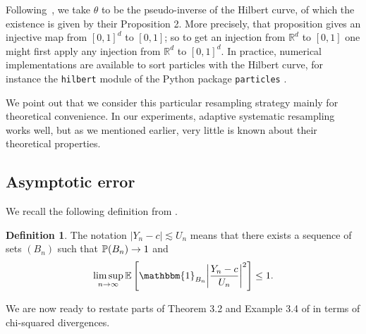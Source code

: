 \documentclass{article}
\theoremstyle{plain}
\theoremstyle{definition}
\newtheorem{definition}[theorem]{Definition}
\theoremstyle{remark}
\begin{document}
Following~\citet{gerber2019negative}, we take $\theta$ to be the pseudo-inverse of the Hilbert curve, of which the existence is given by their Proposition 2. More precisely, that proposition gives an injective map from $[0,1]^d$ to $[0,1]$; so to get an injection from $\mathbb R^d$ to $[0,1]$ one might first apply any injection from $\mathbb R^d$ to $[0,1]^d$. In practice, numerical implementations are available to sort particles with the Hilbert curve, for instance the \verb+hilbert+ module of the Python package \verb+particles+ .

We point out that we consider this particular resampling strategy mainly for theoretical convenience. In our experiments, adaptive systematic resampling works well, but as we mentioned earlier, very little is known about their theoretical properties.

\subsection{Asymptotic error}
We recall the following definition from \citet{webber2019unifying}.
\begin{definition}
	The notation $|Y_n - c| \lesssim U_n$ means that there exists a sequence of sets $(B_n)$ such that $\P(B_n) \to 1$ and
	\begin{equation*}
		\limsup_{n \to \infty} \E\ps{\mathbbm{1}_{B_n} \abs{\frac{Y_n-c}{U_n}}^2} \leq 1.
	\end{equation*}
\end{definition}
We are now ready to restate parts of Theorem 3.2 and Example 3.4 of \citet{webber2019unifying} in terms of chi-squared divergences.
\end{document}
